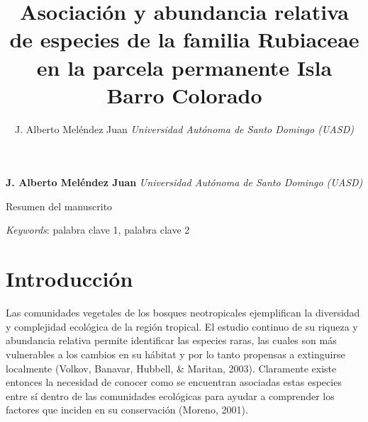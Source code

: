 \documentclass[11pt,]{article}
\title{Asociación y abundancia relativa de especies de la familia Rubiaceae en
la parcela permanente Isla Barro Colorado  }
\author{\Large J. Alberto Meléndez Juan\vspace{0.05in} \newline\normalsize\emph{Universidad Autónoma de Santo Domingo (UASD)}  }
\date{}
\newcommand*{\authorfont}{\fontfamily{phv}\selectfont}
\renewenvironment{abstract}
 {{%
    \setlength{\leftmargin}{0mm}
    \setlength{\rightmargin}{\leftmargin}%
  }%
  \relax}
 {\endlist}
\begin{document}
	
%

{%
\setlength{\parindent}{0pt}
\thispagestyle{plain}
{\fontsize{18}{20}\selectfont\raggedright 
\maketitle  %

}

{
   \vskip 13.5pt\relax \normalsize\fontsize{11}{12} 
\textbf{\authorfont J. Alberto Meléndez Juan} \hskip 15pt \emph{\small Universidad Autónoma de Santo Domingo (UASD)}   

}

}








\begin{abstract}

    \hbox{\vrule height .2pt width 39.14pc}

    \vskip 8.5pt %

\noindent Resumen del manuscrito


\vskip 8.5pt \noindent \emph{Keywords}: palabra clave 1, palabra clave 2 \par

    \hbox{\vrule height .2pt width 39.14pc}



\end{abstract}


\vskip 6.5pt


\noindent  \section{Introducción}\label{introducciuxf3n}

Las comunidades vegetales de los bosques neotropicales ejemplifican la
diversidad y complejidad ecológica de la región tropical. El estudio
continuo de su riqueza y abundancia relativa permite identificar las
especies raras, las cuales son más vulnerables a los cambios en su
hábitat y por lo tanto propensas a extinguirse localmente (Volkov,
Banavar, Hubbell, \& Maritan, 2003). Claramente existe entonces la
necesidad de conocer como se encuentran asociadas estas especies entre
sí dentro de las comunidades ecológicas para ayudar a comprender los
factores que inciden en su conservación (Moreno, 2001).
\end{document}
